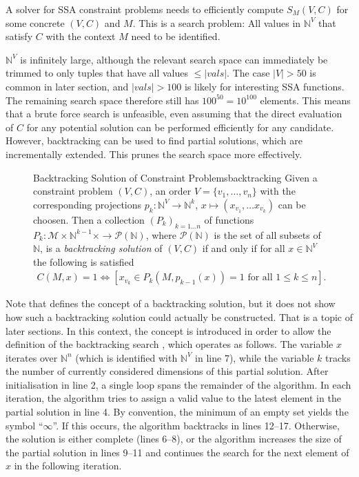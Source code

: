     A solver for SSA constraint problems needs to efficiently compute $S_M(V,C)$
    for some concrete $(V,C)$ and $M$.
    This is a search problem:
    All values in $\mathbb N^V$ that satisfy $C$ with the context $M$ need to
    be identified.

    $\mathbb N^V$ is infinitely large, although the relevant search space can
    immediately be trimmed to only tuples that have all values $\leq|vals|$.
    The case \mbox{$|V|>50$} is common in later section, and \mbox{$|vals|>100$}
    is likely for interesting SSA functions.
    The remaining search space therefore still has $100^{50}=10^{100}$ elements.
    This means that a brute force search is unfeasible, even assuming that
    the direct evaluation of $C$ for any potential solution can be performed
    efficiently for any candidate.
    However, backtracking can be used to find partial solutions, which are
    incrementally extended.
    This prunes the search space more effectively.

\begin{figure}[h]
    \begin{definition}{Backtracking Solution of Constraint Problems}{backtracking}
        Given a constraint problem $(V,C)$, an order $V=\{v_1,\dots,v_n\}$ with
        the corresponding projections $p_k\colon\mathbb N^V\rightarrow\mathbb N^k$,
        $x\mapsto(x_{v_1},\dots x_{v_k})$ can be choosen.
        Then a collection $(P_k)_{k=1\dots n}$ of functions
        $P_k:\mathcal M\times \mathbb N^{k-1}\times\rightarrow\mathcal P(\mathbb N)$,
        where $\mathcal P(\mathbb N)$ is the set of all subsets of $\mathbb N$,
        is a {\em backtracking solution} of $(V,C)$ if and only if for all
        $x\in\mathbb N^V$ the following is satisfied
        \begin{align}
            C(M,x)=1\iff\left[x_{v_k}\in P_k(M,p_{k-1}(x))=1\text{ for all }1\leq k\leq n\right].
        \end{align}
    \end{definition}
\end{figure}

    Note that  defines the concept of a backtracking
    solution, but it does not show how such a backtracking solution could
    actually be constructed.
    That is a topic of later sections.
    In this context, the concept is introduced in order to allow the definition
    of the backtracking search , which operates as
    follows.
    The variable $x$ iterates over $\mathbb N^n$
    (which is identified with $\mathbb N^V$ in line 7), while the variable $k$
    tracks the number of currently considered dimensions of this partial
    solution.
    After initialisation in line 2, a single loop spans the remainder of the
    algorithm.
    In each iteration, the algorithm tries to assign a valid value to the latest
    element in the partial solution in line 4.
    By convention, the minimum of an empty set yields the symbol ``$\infty$''.
    If this occurs, the algorithm backtracks in lines 12--17.
    Otherwise, the solution is either complete (lines 6--8), or the algorithm
    increases the size of the partial solution in lines 9--11 and continues the
    search for the next element of $x$ in the following iteration.

